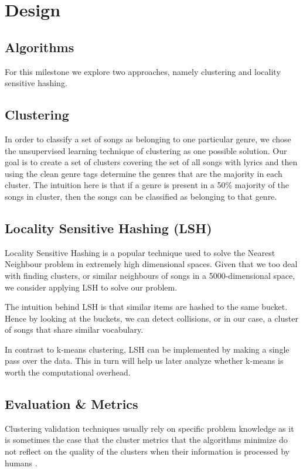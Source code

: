 \documentclass[10pt,a4paper]{scrartcl}
\begin{document}
  \section{Design}  
    \subsection{Algorithms}
      For this milestone we explore two approaches, namely clustering and
      locality sensitive hashing.
      \subsection{Clustering}
        In order to classify a set of songs as belonging to one particular
        genre, we chose the unsupervised learning technique of clustering
        as one possible solution.
        Our goal is to create a set of clusters covering the set of all songs
        with lyrics and then using the clean genre tags determine the genres
        that are the majority in each cluster.   
        The intuition here is that if a genre is present in a 50\% majority
        of the songs in cluster, then the songs can be classified as belonging
        to that genre.
      \subsection{Locality Sensitive Hashing (LSH)}
      Locality Sensitive Hashing is a popular technique used to solve the 
      Nearest Neighbour problem in extremely high dimensional spaces.
      Given that we too deal with finding clusters, or similar neighbours of
      songs in a 5000-dimensional space, we consider applying LSH to solve
      our problem.
      
      The intuition behind LSH is that similar items are hashed to the
      same bucket.
      Hence by looking at the buckets, we can detect collisions, or in our case,
      a cluster of songs that share similar vocabulary.
      
      In contrast to k-means clustering, LSH can be implemented by making a
      single pass over the data.
      This in turn will help us later analyze whether k-means is worth the
      computational overhead.
    \subsection{Evaluation \& Metrics}
      Clustering validation techniques usually rely on specific problem
      knowledge as it is sometimes the case that the cluster metrics
      that the algorithms minimize do not reflect on the quality of the
      clusters when their information is processed by humans
      \cite{halkidi2001clustering}. 
      
\end{document}
